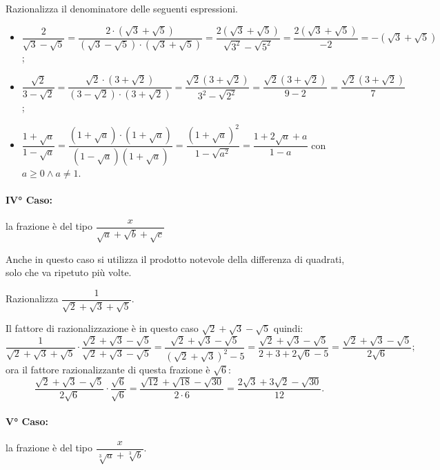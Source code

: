\begin{exrig}
 \begin{esempio}
Razionalizza il denominatore delle seguenti espressioni.
\begin{itemize}
 \item $\dfrac 2{\sqrt 3-\sqrt 5}=\dfrac{2\cdot (\sqrt 3+\sqrt 5)}{(\sqrt 3-\sqrt 5)\cdot (\sqrt 3+\sqrt 5)}=\dfrac{2(\sqrt 3+\sqrt 5)}{\sqrt{3^2}-\sqrt{5^2}}=\dfrac{2(\sqrt 3+\sqrt 5)}{-2}=-(\sqrt 3+\sqrt 5)$;
 \item $\dfrac{\sqrt 2}{3-\sqrt 2}=\dfrac{\sqrt 2\cdot (3+\sqrt 2)}{(3-\sqrt 2)\cdot (3+\sqrt 2)}=\dfrac{\sqrt 2(3+\sqrt 2)}{3^2-\sqrt{2^2}}=\dfrac{\sqrt 2(3+\sqrt 2)}{9-2}=\dfrac{\sqrt 2(3+\sqrt 2)} 7$;
 \item $\dfrac{1+\sqrt a}{1-\sqrt a}=\dfrac{(1+\sqrt a)\cdot (1+\sqrt a)}{(1-\sqrt a)(1+\sqrt a)}=\dfrac{(1+\sqrt a)^2}{1-\sqrt{a^2}}=\dfrac{1+2\sqrt a+a}{1-a}$ con $a\ge 0\wedge a\neq 1$.
\end{itemize}
 \end{esempio}
\end{exrig}

\paragraph{IV° Caso:} la frazione è del tipo $\dfrac x{\sqrt a+\sqrt b+\sqrt c}$

Anche in questo caso si utilizza il prodotto notevole della differenza di quadrati, solo che va ripetuto più volte.

\begin{exrig}
 \begin{esempio}
Razionalizza $\dfrac 1{\sqrt 2+\sqrt 3+\sqrt 5}$.

Il fattore di razionalizzazione è in questo caso $\sqrt 2+\sqrt 3-\sqrt 5$ quindi:
 \[\dfrac 1{\sqrt 2+\sqrt 3+\sqrt 5}\cdot \dfrac{\sqrt 2+\sqrt 3-\sqrt 5}{\sqrt 2+\sqrt 3-\sqrt 5}=\dfrac{\sqrt 2+\sqrt 3-\sqrt 5}{(\sqrt 2+\sqrt 3)^2-5}=\dfrac{\sqrt 2+\sqrt 3-\sqrt 5}{2+3+2\sqrt 6-5}=\dfrac{\sqrt 2+\sqrt 3-\sqrt 5}{2\sqrt 6};\]
 ora il fattore razionalizzante di questa frazione è $\sqrt 6$:
 \[\dfrac{\sqrt 2+\sqrt 3-\sqrt 5}{2\sqrt 6}\cdot \dfrac{\sqrt 6}{\sqrt 6}=\dfrac{\sqrt{12}+\sqrt{18}-\sqrt{30}}{2\cdot 6}=\dfrac{2\sqrt 3+3\sqrt 2-\sqrt{30}}{12}.\]
 \end{esempio}
\end{exrig}

\paragraph{V° Caso:} la frazione è del tipo $\dfrac x{\sqrt[3]a+\sqrt[3]b}$.

